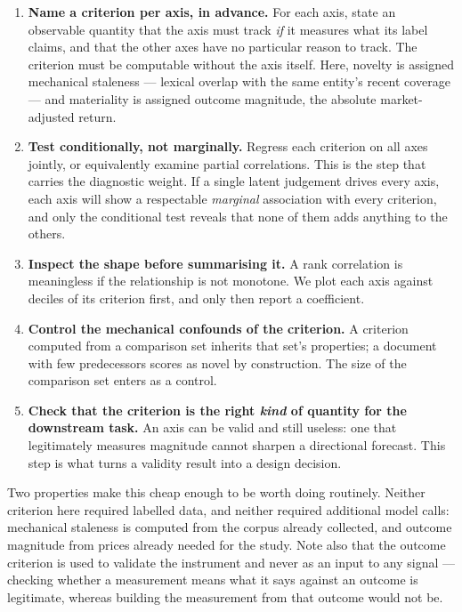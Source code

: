 \begin{enumerate}
\item \textbf{Name a criterion per axis, in advance.} For each axis, state an
  observable quantity that the axis must track \emph{if} it measures what its
  label claims, and that the other axes have no particular reason to track. The
  criterion must be computable without the axis itself. Here, novelty is assigned
  mechanical staleness --- lexical overlap with the same entity's recent coverage
  --- and materiality is assigned outcome magnitude, the absolute market-adjusted
  return.
\item \textbf{Test conditionally, not marginally.} Regress each criterion on all
  axes jointly, or equivalently examine partial correlations. This is the step
  that carries the diagnostic weight. If a single latent judgement drives every
  axis, each axis will show a respectable \emph{marginal} association with every
  criterion, and only the conditional test reveals that none of them adds anything
  to the others.
\item \textbf{Inspect the shape before summarising it.} A rank correlation is
  meaningless if the relationship is not monotone. We plot each axis against
  deciles of its criterion first, and only then report a coefficient.
\item \textbf{Control the mechanical confounds of the criterion.} A criterion
  computed from a comparison set inherits that set's properties; a document with
  few predecessors scores as novel by construction. The size of the comparison set
  enters as a control.
\item \textbf{Check that the criterion is the right \emph{kind} of quantity for
  the downstream task.} An axis can be valid and still useless: one that
  legitimately measures magnitude cannot sharpen a directional forecast. This step
  is what turns a validity result into a design decision.
\end{enumerate}

Two properties make this cheap enough to be worth doing routinely. Neither
criterion here required labelled data, and neither required additional model
calls: mechanical staleness is computed from the corpus already collected, and
outcome magnitude from prices already needed for the study. Note also that the
outcome criterion is used to validate the instrument and never as an input to any
signal --- checking whether a measurement means what it says against an outcome is
legitimate, whereas building the measurement from that outcome would not be.

